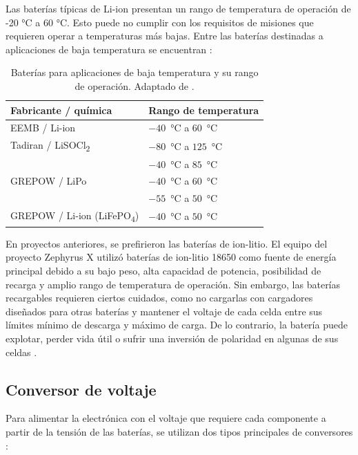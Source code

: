 \documentclass[12pt,a4paper]{article}
\begin{document}
Las baterías típicas de Li-ion presentan un rango de temperatura de operación de -20 °C a 60 °C. Esto puede no cumplir con los requisitos de misiones que requieren operar a temperaturas más bajas. Entre las baterías destinadas a aplicaciones de baja temperatura se encuentran \cite{ref39}:

\begin{table}[H]
\centering
\small
\renewcommand{\arraystretch}{1.3}
\begin{tabular}{@{}ll@{}}
\toprule
\textbf{Fabricante / química} & \textbf{Rango de temperatura} \\
\midrule
EEMB / Li-ion & $-40$~°C a $60$~°C \\
\midrule
Tadiran / LiSOCl\textsubscript{2} & $-80$~°C a $125$~°C \\
 & $-40$~°C a $85$~°C \\
\midrule
GREPOW / LiPo & $-40$~°C a $60$~°C \\
 & $-55$~°C a $50$~°C \\
\midrule
GREPOW / Li-ion (LiFePO\textsubscript{4}) & $-40$~°C a $50$~°C \\
\bottomrule
\end{tabular}
\caption{Baterías para aplicaciones de baja temperatura y su rango de operación. Adaptado de \cite{ref39}.}
\label{tab:baterias-baja-temperatura}
\end{table}

En proyectos anteriores, \cite{ref2,ref3,ref99} se prefirieron las baterías de ion-litio. El equipo del proyecto Zephyrus X utilizó baterías de ion-litio 18650 como fuente de energía principal debido a su bajo peso, alta capacidad de potencia, posibilidad de recarga y amplio rango de temperatura de operación. Sin embargo, las baterías recargables requieren ciertos cuidados, como no cargarlas con cargadores diseñados para otras baterías y mantener el voltaje de cada celda entre sus límites mínimo de descarga y máximo de carga. De lo contrario, la batería puede explotar, perder vida útil o sufrir una inversión de polaridad en algunas de sus celdas \cite{ref115}.

\subsection{Conversor de voltaje}\label{conversor-de-voltaje}

Para alimentar la electrónica con el voltaje que requiere cada componente a partir de la tensión de las baterías, se utilizan dos tipos principales de conversores \cite{ref105}:
\end{document}
